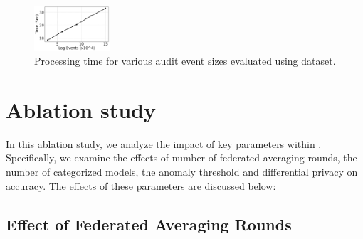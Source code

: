 \begin{figure}[!t]
 \centering
 \includegraphics[width=0.25\textwidth]{fig/sizevstime.pdf}
 \caption{Processing time for various audit event sizes evaluated using \optc dataset.}
 \label{sizevstime}
 \vspace{-2ex}
\end{figure}


\section*{Ablation study}
\label{app:ablation}

In this ablation study, we analyze the impact of key parameters within \Sys. Specifically, we examine the effects of number of federated averaging rounds, the number of \gnnshort categorized models, the anomaly threshold and differential privacy on accuracy. The effects of these parameters are discussed below:



\subsection*{Effect of Federated Averaging Rounds}
\label{app:fedrounds}

